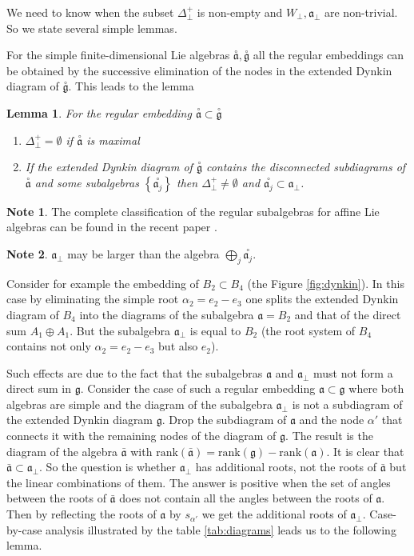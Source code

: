 \documentclass[12pt]{iopart}
\newtheorem{lemma}{Lemma}
\theoremstyle{definition}
\theoremstyle{definition}
\newtheorem{mynote}{Note}[section]
\theoremstyle{definition}
\newcommand{\go}{\stackrel{\circ }{\mathfrak{g}}}
\newcommand{\ao}{\stackrel{\circ }{\mathfrak{a}}}
\newcommand{\co}[1]{\stackrel{\circ }{#1}}
\begin{document}
We need to know when the subset $\Delta^{+}_{\bot}$ is non-empty and $W_{\bot},\mathfrak{a}_{\bot}$ are non-trivial. So we state several simple lemmas.

For the simple finite-dimensional Lie algebras $\ao,\go$ all the regular embeddings can be obtained by the successive elimination of the nodes in the extended Dynkin diagram of $\go$. This leads to the lemma
\begin{lemma}
  For the regular embedding $\ao\subset \go$ 
  \renewcommand{\theenumi}{\alph{enumi}}
  \begin{enumerate}
  \item $\Delta^{+}_{\bot}=\emptyset$ if $\ao$ is maximal
  \item If the extended Dynkin diagram of $\go$ contains the disconnected subdiagrams of $\ao$ and some subalgebras $\left\{\co{\mathfrak{a}_j}\right\}$ then $\Delta^{+}_{\bot}\neq \emptyset$ and $\co{\mathfrak{a}_j}\subset \mathfrak{a}_{\bot}$.
  \end{enumerate}
\end{lemma}
\begin{mynote}
  The complete classification of the regular subalgebras for affine Lie algebras can be
  found in the recent paper \cite{1751-8121-41-36-365204}.
\end{mynote}
\begin{mynote}
  $\mathfrak{a}_{\bot}$ may be larger than the algebra $\bigoplus_j \co{\mathfrak{a}_j}$.
\end{mynote}
Consider for example the embedding of $B_2\subset B_4$ (the Figure \ref{fig:dynkin}).
In this case by eliminating
the simple root $\alpha_2=e_2-e_3$ one splits the extended Dynkin diagram of $B_4$
into the diagrams of the subalgebra $\mathfrak{a}=B_2$ and that of the direct
sum $A_1 \oplus A_1 $. But the subalgebra $\mathfrak{a}_{\bot}$ is equal to $B_2$
(the root system of $B_4$ contains not only $\alpha_2=e_2-e_3$ but also $e_2$).

Such effects are due to the fact that the subalgebras $\mathfrak{a}$ and $\mathfrak{a}_{\bot}$
must not form a direct sum in $\mathfrak{g}$.
Consider the case of such a regular embedding $\mathfrak{a}\subset \mathfrak{g}$ where both
algebras are simple and the diagram of the subalgebra $\mathfrak{a}_{\bot}$ is not a
subdiagram of the extended Dynkin diagram $\mathfrak{g}$.
Drop the subdiagram of $\mathfrak{a}$ and the node $\alpha'$ that connects it with
the remaining nodes of the diagram of $\mathfrak{g}$. The result is the diagram of
the algebra $\bar{\mathfrak{a}}$ with $\mathrm{rank}(\bar{\mathfrak{a}}) =
\mathrm{rank}(\mathfrak{g})-\mathrm{rank}(\mathfrak{a})$. It is clear that
$\bar{\mathfrak{a}}\subset \mathfrak{a}_{\bot}$. So the question is whether
$\mathfrak{a}_{\bot}$ has additional roots,  not the roots of $\bar{\mathfrak{a}}$
but the linear combinations of them. The answer is positive  when the set of angles
between the roots of $\bar{\mathfrak{a}}$ does not contain all the angles between
the roots of $\mathfrak{a}$.
Then by reflecting the roots of $\mathfrak{a}$ by $s_{\alpha'}$ we get the additional
roots of $\mathfrak{a}_{\bot}$.
Case-by-case analysis illustrated by the table \ref{tab:diagrams} leads us to the following lemma.
\end{document}
